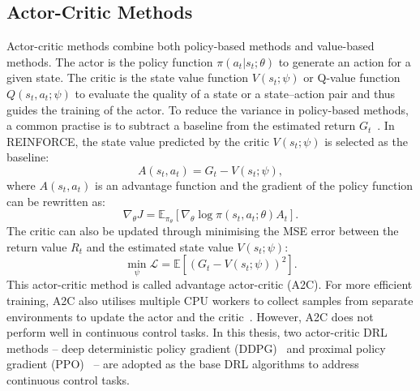 \subsection{Actor-Critic Methods}
\label{ch3:actor-critic}
Actor-critic methods combine both policy-based methods and value-based methods. The actor is the policy function $\pi(a_{t}|s_{t};\theta)$ to generate an action for a given state. The critic is the state value function $V(s_{t};\psi)$ or Q-value function $Q(s_{t},a_{t};\psi)$ to evaluate the quality of a state or a state--action pair and thus guides the training of the actor. To reduce the variance in policy-based methods, a common practise is to subtract a baseline from the estimated return $G_{t}$~\cite{sutton2018reinforcement}. In REINFORCE, the state value predicted by the critic $V(s_{t};\psi)$ is selected as the baseline:
\begin{equation}
    A(s_{t}, a_{t}) = G_{t} - V(s_{t};\psi),
\end{equation}
where $A(s_{t}, a_{t})$ is an advantage function and the gradient of the policy function can be rewritten as:
\begin{equation}
    \nabla_{\theta} J = \mathbb{E}_{\pi_{\theta}}[\nabla_{\theta}\log\pi(s_{t},a_{t};\theta)A_{t}].
\end{equation}
The critic can also be updated through minimising the MSE error between the return value $R_{t}$ and the estimated state value $V(s_{t};\psi)$:
\begin{equation}
    \min_{\psi}\mathcal{L} = \mathbb{E}[(G_{t} - V(s_{t};\psi))^2].
    \label{eq:mse}
\end{equation}
This actor-critic method is called advantage actor-critic (A2C). For more efficient training, A2C also utilises multiple CPU workers to collect samples from separate environments to update the actor and the critic~\cite{mnih2016asynchronous}. However, A2C does not perform well in continuous control tasks. In this thesis, two actor-critic DRL methods -- deep deterministic policy gradient (DDPG)~\cite{lillicrap2015continuous} and proximal policy gradient (PPO)~\cite{schulman2017proximal} -- are adopted as the base DRL algorithms to address continuous control tasks.
\newpage

